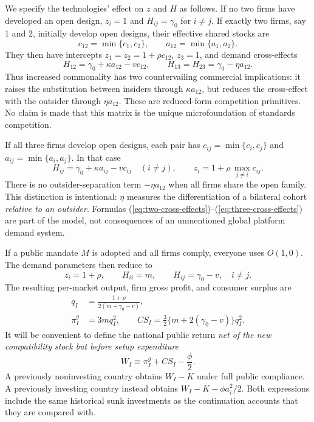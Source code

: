 We specify the technologies' effect on \(z\) and \(H\) as follows. If no two firms have developed an open design, \(z_i=1\) and \(H_{ij}=\gamma_0\) for \(i\ne j\). If exactly two firms, say 1 and 2, initially develop open designs, their effective shared stocks are
\[
 c_{12}=\min\{c_1,c_2\},\qquad a_{12}=\min\{a_1,a_2\}.
\]
They then have intercepts \(z_1=z_2=1+\rho c_{12}\), \(z_3=1\), and demand cross-effects
\begin{equation}
 H_{12}=\gamma_0+\kappa a_{12}-vc_{12},
 \qquad
 H_{13}=H_{23}=\gamma_0-\eta a_{12}.
 \label{eq:two-cross-effects}
\end{equation}
Thus increased commonality has two countervailing commercial implications: it raises the substitution between insiders through \(\kappa a_{12}\), but reduces the cross-effect with the outsider through \(\eta a_{12}\). These are reduced-form competition primitives. No claim is made that this matrix is the unique microfoundation of standards competition.

If all three firms develop open designs, each pair has \(c_{ij}=\min\{c_i,c_j\}\) and \(a_{ij}=\min\{a_i,a_j\}\). In that case
\begin{equation}
 H_{ij}=\gamma_0+\kappa a_{ij}-vc_{ij}
 \quad (i\ne j),\qquad
 z_i=1+\rho\,\max_{j\ne i}c_{ij}.
 \label{eq:three-cross-effects}
\end{equation}
There is no outsider-separation term \(-\eta a_{12}\) when all firms share the open family. This distinction is intentional: \(\eta\) measures the differentiation of a bilateral cohort \emph{relative to an outsider}. Formulas (\ref{eq:two-cross-effects})--(\ref{eq:three-cross-effects}) are part of the model, not consequences of an unmentioned global platform demand system.

If a public mandate \(M\) is adopted and all firms comply, everyone uses \(O(1,0)\). The demand parameters then reduce to
\[
 z_i=1+\rho,\qquad H_{ii}=m,\qquad
 H_{ij}=\gamma_0-v,\quad i\ne j.
\]
The resulting per-market output, firm gross profit, and consumer surplus are
\begin{align}
 q_I&=\frac{1+\rho}{2(m+\gamma_0-v)}, \label{eq:qi}\\
 \pi_I^g&=3m q_I^2,\qquad
 CS_I=\frac{3}{2}\{m+2(\gamma_0-v)\}q_I^2.
 \label{eq:public-gross}
\end{align}
It will be convenient to define the national public return \emph{net of the new compatibility stock but before setup expenditure}
\begin{equation}
 W_I\equiv\pi_I^g+CS_I-\frac{\phi}{2}.
 \label{eq:WI}
\end{equation}
A previously noninvesting country obtains \(W_I-K\) under full public compliance. A previously investing country instead obtains \(W_I-K-\phi a_i^2/2\). Both expressions include the same historical sunk investments as the continuation accounts that they are compared with.

